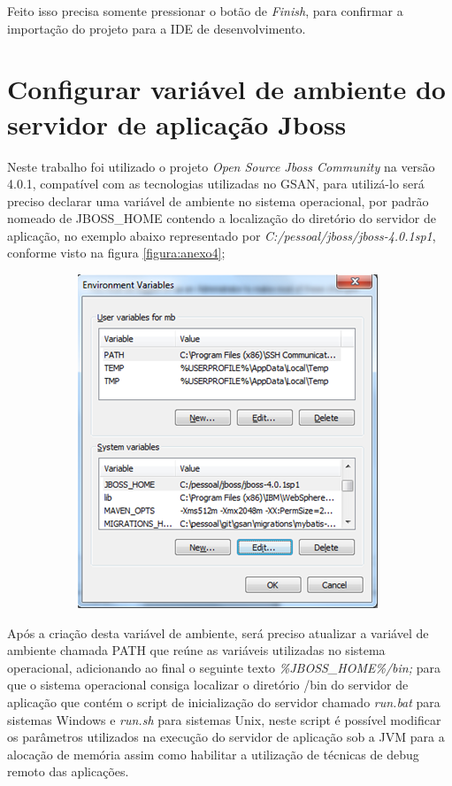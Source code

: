 \begin{apendicesenv}
Feito isso precisa somente pressionar o botão de \textit{Finish}, para confirmar a importação do projeto para a IDE de desenvolvimento.

\chapter{Configurar variável de ambiente do servidor de aplicação Jboss}

Neste trabalho foi utilizado o projeto \textit{Open Source Jboss Community} na versão 4.0.1, compatível com as tecnologias utilizadas no GSAN, para utilizá-lo será preciso declarar uma variável de ambiente no sistema operacional, por padrão nomeado de JBOSS\_HOME contendo a localização do diretório do servidor de aplicação, no exemplo abaixo representado por \textit{C:/pessoal/jboss/jboss-4.0.1sp1}, conforme visto na figura \ref{figura:anexo4};

\begin{figure}[H]
	\centering
	\caption*{\textbf{Adicionando variável de ambiente JBOSS\_HOME.}}
	\label{figura:anexo4}
	\begin{subfigure}[H]{\textwidth}
		\centering
		\includegraphics{figuras/anexo/var_JBOSS_HOME.png}
	\end{subfigure}
\end{figure}


Após a criação desta variável de ambiente, será preciso atualizar a variável de ambiente chamada PATH que reúne as variáveis utilizadas no sistema operacional, adicionando ao final o seguinte texto \textit{\%JBOSS\_HOME\%/bin;} para que o sistema operacional consiga localizar o diretório /bin do servidor de aplicação que contém o script de inicialização do servidor chamado \textit{run.bat} para sistemas Windows e \textit{run.sh} para sistemas Unix, neste script é possível modificar os parâmetros utilizados na execução do servidor de aplicação sob a JVM para a alocação de memória assim como habilitar a utilização de técnicas de debug remoto das aplicações.



\end{apendicesenv}
